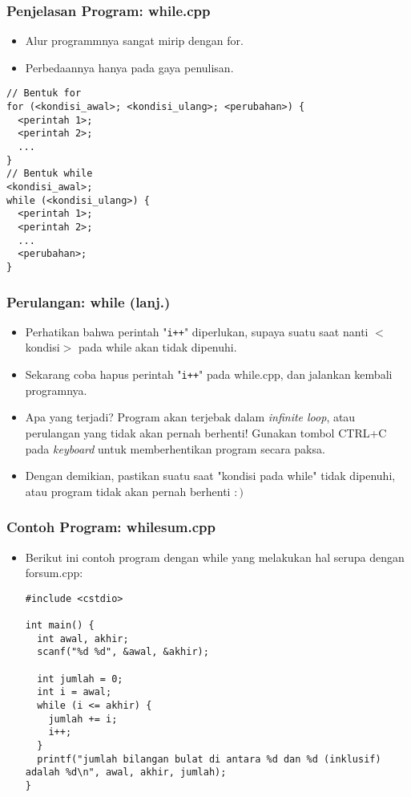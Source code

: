 \begin{frame}[fragile]
\frametitle{Penjelasan Program: while.cpp}
\begin{itemize}
  \item Alur programmnya sangat mirip dengan for.
  \item Perbedaannya hanya pada gaya penulisan.
\end{itemize}
\begin{lstlisting}
// Bentuk for
for (<kondisi_awal>; <kondisi_ulang>; <perubahan>) {
  <perintah 1>;
  <perintah 2>;
  ...
}
// Bentuk while
<kondisi_awal>;
while (<kondisi_ulang>) {
  <perintah 1>;
  <perintah 2>;
  ...
  <perubahan>;
}
\end{lstlisting}

\end{frame}

\begin{frame}
\frametitle{Perulangan: while (lanj.)}
\begin{itemize}
  \item Perhatikan bahwa perintah "\texttt{i++}" diperlukan, supaya suatu saat nanti $<$kondisi$>$ pada while akan tidak dipenuhi.
  \item Sekarang coba hapus perintah "\texttt{i++}" pada while.cpp, dan jalankan kembali programnya.
  \item Apa yang terjadi? Program akan terjebak dalam \alert{\textit{infinite loop}}, atau \alert{perulangan yang tidak akan pernah berhenti}! Gunakan tombol CTRL+C pada \textit{keyboard} untuk memberhentikan program secara paksa.
  \item Dengan demikian, pastikan suatu saat "kondisi pada while" tidak dipenuhi, atau program tidak akan pernah berhenti $:)$
\end{itemize}
\end{frame}

\begin{frame}[fragile]
\frametitle{Contoh Program: whilesum.cpp}
\begin{itemize}
  \item Berikut ini contoh program dengan while yang melakukan hal serupa dengan forsum.cpp:
\begin{lstlisting}
#include <cstdio>

int main() {
  int awal, akhir;
  scanf("%d %d", &awal, &akhir);

  int jumlah = 0;
  int i = awal;
  while (i <= akhir) {
    jumlah += i;
    i++;
  }
  printf("jumlah bilangan bulat di antara %d dan %d (inklusif) adalah %d\n", awal, akhir, jumlah);
}
\end{lstlisting}
\end{itemize}
\end{frame}

